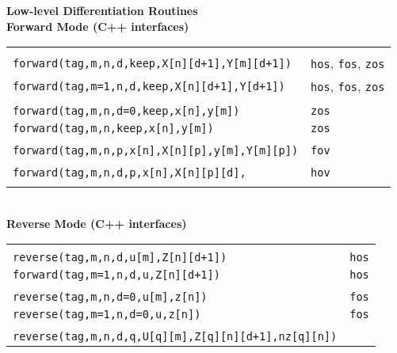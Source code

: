 \documentclass[12pt,oneside,a4paper]{article}
\begin{document}
\newpage
\begin{center}\Large
{\Huge \bf Low-level Differentiation Routines}\\[3ex]
{\Large \bf  Forward Mode (C++ interfaces)}\\[2ex]
\begin{tabular}{|p{13.6cm}|p{3.0cm}|}
\hline & \\[-2.0ex]
{\tt forward(tag,m,n,d,keep,X[n][d+1],Y[m][d+1])} & 
           {\large {\tt hos}, {\tt fos}, {\tt zos}} \\[0.5ex]
{\tt forward(tag,m=1,n,d,keep,X[n][d+1],Y[d+1])} & 
           {\large {\tt hos}, {\tt fos}, {\tt zos}} \\[1.0ex]
\hline& \\[-2.0ex] 
{\tt forward(tag,m,n,d=0,keep,x[n],y[m])} & 
           {\large {\tt zos}} \\[0.5ex]
{\tt forward(tag,m,n,keep,x[n],y[m])} & 
           {\large {\tt zos}} \\[1.0ex]
\hline& \\[-2.0ex] 
{\tt forward(tag,m,n,p,x[n],X[n][p],y[m],Y[m][p])} &
           {\large {\tt fov}} \\[1.0ex]
\hline& \\[-2.0ex] 
{\tt forward(tag,m,n,d,p,x[n],X[n][p][d],} & {\large {\tt hov}} \\[0.5ex]
\hspace{8.7cm}{\tt y[m],Y[m][p][d])} & \\[1.0ex]
\hline
\end{tabular}\\[4ex]
%
{\Large \bf  Reverse Mode (C++ interfaces)}\\[2ex]
\begin{tabular}{|p{15.6cm}|p{0.8cm}|}
\hline & \\[-2.0ex]
{\tt reverse(tag,m,n,d,u[m],Z[n][d+1])} & 
           {\large {\tt hos}} \\[0.5ex]
{\tt forward(tag,m=1,n,d,u,Z[n][d+1])} & 
           {\large {\tt hos}} \\[1.0ex]
\hline& \\[-2.0ex] 
{\tt reverse(tag,m,n,d=0,u[m],z[n])} & 
           {\large {\tt fos}} \\[0.5ex]
{\tt reverse(tag,m=1,n,d=0,u,z[n])} & 
           {\large {\tt fos}} \\[1.0ex]
\hline& \\[-2.0ex] 
{\tt reverse(tag,m,n,d,q,U[q][m],Z[q][n][d+1],nz[q][n])} & 

\end{tabular}
\end{center}
\end{document}
